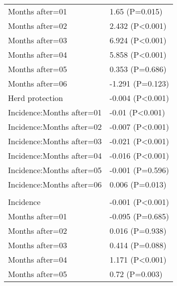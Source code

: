 \documentclass[]{article}
\begin{document}
\begin{longtable}[t]{ll}
\hspace{1em}Months after=01 & 1.65 (P=0.015)\\
\hspace{1em}Months after=02 & 2.432 (P<0.001)\\
\hspace{1em}Months after=03 & 6.924 (P<0.001)\\
\hspace{1em}Months after=04 & 5.858 (P<0.001)\\
\hspace{1em}Months after=05 & 0.353 (P=0.686)\\
\hspace{1em}Months after=06 & -1.291 (P=0.123)\\
\hspace{1em}Herd protection & -0.004 (P<0.001)\\
\hspace{1em}Incidence:Months after=01 & -0.01 (P<0.001)\\
\hspace{1em}Incidence:Months after=02 & -0.007 (P<0.001)\\
\hspace{1em}Incidence:Months after=03 & -0.021 (P<0.001)\\
\hspace{1em}Incidence:Months after=04 & -0.016 (P<0.001)\\
\hspace{1em}Incidence:Months after=05 & -0.001 (P=0.596)\\
\hspace{1em}Incidence:Months after=06 & 0.006 (P=0.013)\\
\addlinespace[1.5em]
\multicolumn{2}{l}{\textbf{Temporary field worker}}\\
\hspace{1em}Incidence & -0.001 (P<0.001)\\
\hspace{1em}Months after=01 & -0.095 (P=0.685)\\
\hspace{1em}Months after=02 & 0.016 (P=0.938)\\
\hspace{1em}Months after=03 & 0.414 (P=0.088)\\
\hspace{1em}Months after=04 & 1.171 (P<0.001)\\
\hspace{1em}Months after=05 & 0.72 (P=0.003)\\

\end{longtable}
\end{document}

